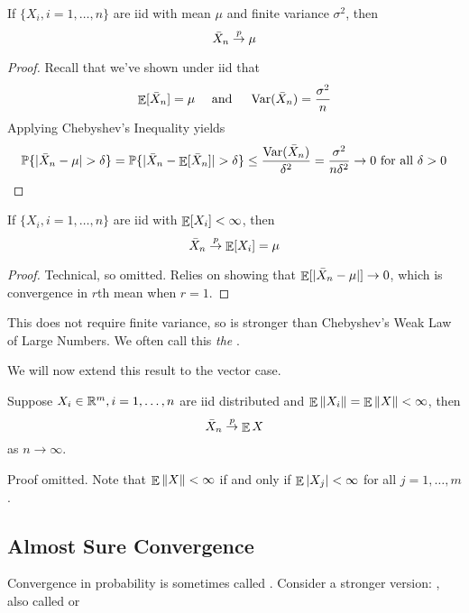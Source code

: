 \documentclass[10pt]{article}
\begin{document}
\begin{theorem}
	 If $\{X_i, i = 1,\dots,n\}$ are iid with mean $\mu$ and finite variance $\sigma^2$, then
	\[
	\bar{X}_n \overset{p}{\to} \mu
	\]
\end{theorem}
\begin{proof}
	Recall that we've shown under iid that
	\[
	\mathop{\mathbb{E}}[\bar{X}_n] = \mu \quad \text{ and } \quad \mathop{\rm Var}(\bar{X}_n) = \frac{\sigma^2}{n}
	\]
	Applying Chebyshev's Inequality yields
	\[
	\mathbb{P}\{|\bar{X}_n - \mu | > \delta\} = \mathbb{P}\{|\bar{X}_n - \mathop{\mathbb{E}}[\bar{X}_n]| > \delta\} \le \frac{\mathop{\rm Var}(\bar{X}_n)}{\delta^2} = \frac{\sigma^2}{n \delta^2} \to 0 \text{ for all } \delta > 0
	\]
\end{proof}

\begin{theorem}
	 If $\{X_i,i = 1,\dots,n\}$ are iid with $\mathop{\mathbb{E}}[X_i] < \infty$, then
	\[
	\bar{X}_n \overset{p}{\to} \mathop{\mathbb{E}}[X_i] = \mu
	\]
\end{theorem}
\begin{proof}
	Technical, so omitted. Relies on showing that $\mathop{\mathbb{E}}[|\bar{X}_n - \mu|] \to 0$, which is convergence in $r$th mean when $r = 1$.
\end{proof}

\begin{remark}
	This does not require finite variance, so is stronger than Chebyshev's Weak Law of Large Numbers. We often call this \emph{the} .
\end{remark}

We will now extend this result to the vector case.

\begin{theorem}
	Suppose $X_i \in \mathbb{R}^m, i = 1,\dots,n$ are iid distributed and $\mathop{\mathbb{E}} \|X_i\| = \mathop{\mathbb{E}} \|X\| < \infty$, then
	\[
	\bar{X}_n \overset{p}{\to} \mathop{\mathbb{E}} X
	\]
	as $n \to \infty$.
\end{theorem}
Proof omitted. Note that $\mathop{\mathbb{E}} \|X\| < \infty$ if and only if $\mathop{\mathbb{E}} |X_j| < \infty$ for all $j = 1,\dots,m$.

\subsection{Almost Sure Convergence}

Convergence in probability is sometimes called . Consider a stronger version: , also called  or 
\end{document}
